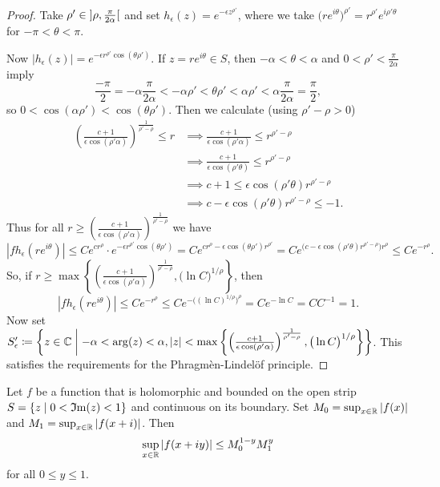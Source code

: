 \begin{proof}
Take $\rho'\in \interval[o]{\rho, \frac{\pi}{2\alpha}}$ and set $h_\epsilon(z) = e^{-\epsilon z^{\rho'}}$, where we take $\big(re^{i\theta}\big)^{\rho'} = r^{\rho'}e^{i\rho'\theta}$ for $-\pi < \theta <\pi$.

Now $|h_\epsilon(z)| = e^{-\epsilon r^{\rho'}\cos(\theta\rho')}$. If $z = re^{i\theta}\in S$, then $-\alpha < \theta < \alpha$ and $0 < \rho' < \frac{\pi}{2\alpha}$ imply 
\[ \frac{-\pi}{2} = -\alpha\frac{\pi}{2\alpha} < -\alpha\rho' < \theta\rho' < \alpha\rho' < \alpha\frac{\pi}{2\alpha} = \frac{\pi}{2}, \]
so $0< \cos(\alpha\rho') < \cos(\theta\rho')$. Then we calculate (using $\rho'-\rho > 0$)
\begin{align*}
\left(\frac{c+1}{\epsilon\cos(\rho'\alpha)}\right)^{\frac{1}{\rho'-\rho}} \leq r &\implies \frac{c+1}{\epsilon\cos(\rho'\alpha)} \leq r^{\rho' -\rho} \\
&\implies \frac{c+1}{\epsilon\cos(\rho'\theta)} \leq r^{\rho' -\rho} \\
&\implies c+1 \leq \epsilon\cos(\rho'\theta)r^{\rho' -\rho} \\
&\implies c - \epsilon\cos(\rho'\theta)r^{\rho' -\rho} \leq -1.
\end{align*}
Thus for all $r\geq \left(\frac{c+1}{\epsilon\cos(\rho'\alpha)}\right)^{\frac{1}{\rho'-\rho}}$ we have
\[ |fh_\epsilon(re^{i\theta})| \leq Ce^{cr^\rho} \cdot e^{-\epsilon r^{\rho'}\cos(\theta\rho')} = Ce^{cr^\rho - \epsilon \cos(\theta\rho') r^{\rho'}} = Ce^{\big(c - \epsilon\cos(\rho'\theta)r^{\rho' -\rho}\big)r^\rho} \leq Ce^{-r^\rho}. \]
So, if $r \geq \max\left\{\left(\frac{c+1}{\epsilon\cos(\rho'\alpha)}\right)^{\frac{1}{\rho'-\rho}}, \big(\ln C\big)^{1/\rho}\right\}$, then 
\[ |fh_\epsilon(re^{i\theta})| \leq Ce^{-r^\rho} \leq Ce^{-\big((\ln C)^{1/\rho}\big)^\rho} = Ce^{-\ln C} = CC^{-1} = 1. \]
Now set $S'_\epsilon \defeq \setbuilder{z\in \C}{-\alpha < \arg(z) < \alpha, |z| < \max\left\{\left(\frac{c+1}{\epsilon\cos(\rho'\alpha)}\right)^{\frac{1}{\rho'-\rho}}, \big(\ln C\big)^{1/\rho}\right\}}$. This satisfies the requirements for the Phragmèn-Lindelöf principle.
\end{proof}
\begin{corollary}
Let $f$ be a function that is holomorphic and bounded on the open strip $S = \setbuilder{z}{0 < \Im(z) < 1}$ and continuous on its boundary. Set $M_0 = \sup_{x\in \mathbb{R}}|f(x)|$ and $M_1 = \sup_{x\in \mathbb{R}}|f(x+i)|$. Then
\[ \sup_{x\in \mathbb{R}}|f(x+iy)| \leq M_0^{1-y}M_1^y \]
for all $0\leq y\leq 1$.
\end{corollary}
